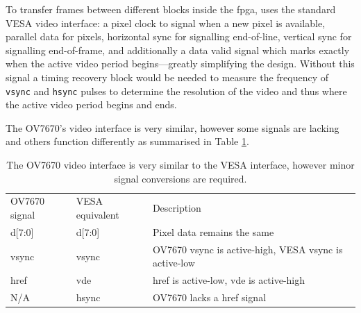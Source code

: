 To transfer frames between different blocks inside the \gls{fpga}, uses the standard VESA video interface: a pixel clock to signal when a new pixel is available, parallel data for pixels, horizontal sync for signalling end-of-line, vertical sync for signalling end-of-frame, and additionally a data valid signal which marks exactly when the active video period begins---greatly simplifying the design. Without this signal a timing recovery block would be needed to measure the frequency of \texttt{vsync} and \texttt{hsync} pulses to determine the resolution of the video and thus where the active video period begins and ends.

The OV7670's video interface is very similar, however some signals are lacking and others function differently as summarised in Table \ref{table:ov7670_video_interface}. 

\begin{table}
  \begin{tabular}{lll}
  OV7670 signal   & VESA equivalent & Description                                           \\
  d[7:0]          & d[7:0]          & Pixel data remains the same                           \\
  vsync           & vsync           & OV7670 vsync is active-high, VESA vsync is active-low \\
  href            & vde             & href is active-low, vde is active-high                \\
  N/A             & hsync           & OV7670 lacks a href signal
  \end{tabular}
  \caption{The OV7670 video interface is very similar to the VESA interface, however minor signal conversions are required.}
  \label{table:ov7670_video_interface}
\end{table}



